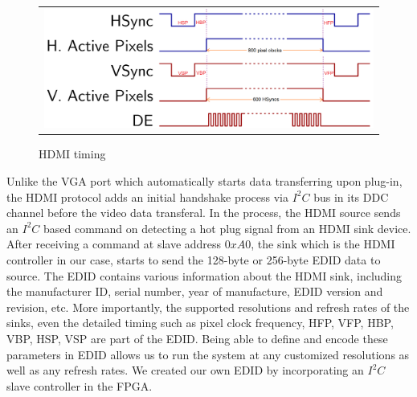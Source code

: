 \documentclass[]{spie}  %
\begin{document}
\begin{figure}
   \begin{center}
   \begin{tabular}{c}
   \includegraphics[width=\linewidth]{wf3.png} 
   \end{tabular}
   \end{center}
   \caption{HDMI timing}%
   \label{Fig:1}%
   \end{figure} 

Unlike the VGA port which automatically starts data transferring upon plug-in, the HDMI protocol adds an initial handshake process via $I^2C$ bus in its DDC channel before the video data transferal. In the process, the HDMI source sends an $I^2C$ based command on detecting a hot plug signal from an HDMI sink device. After receiving a command at slave address $0xA0$, the sink which is the HDMI controller in our case, starts to send the 128-byte or 256-byte EDID data to source. The EDID contains various information about the HDMI sink, including the manufacturer ID, serial number, year of manufacture, EDID version and revision, etc. More importantly, the supported resolutions and refresh rates of the sinks, even the detailed timing such as pixel clock frequency, HFP, VFP, HBP, VBP, HSP, VSP are part of the EDID. Being able to define and encode these parameters in EDID allows us to run the system at any customized resolutions as well as any refresh rates. We created our own EDID by incorporating an $I^2C$ slave controller in the FPGA.
\end{document}
